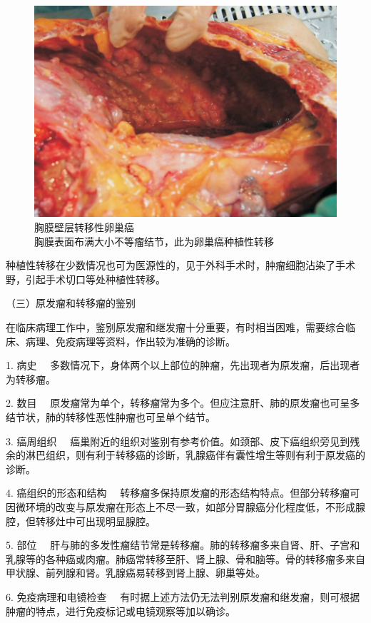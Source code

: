 \begin{figure}[!htbp]
 \centering
 \includegraphics{./images/Image00076.jpg}
 \caption{胸膜壁层转移性卵巢癌 \\ {\small 胸膜表面布满大小不等瘤结节，此为卵巢癌种植性转移}}
 \label{fig5-9}
  \end{figure}



种植性转移在少数情况也可为医源性的，见于外科手术时，肿瘤细胞沾染了手术野，引起手术切口等处种植性转移。

{（三）原发瘤和转移瘤的鉴别}

在临床病理工作中，鉴别原发瘤和继发瘤十分重要，有时相当困难，需要综合临床、病理、免疫病理等资料，作出较为准确的诊断。

{1. 病史}
　多数情况下，身体两个以上部位的肿瘤，先出现者为原发瘤，后出现者为转移瘤。

{2. 数目}
　原发瘤常为单个，转移瘤常为多个。但应注意肝、肺的原发瘤也可呈多结节状，肺的转移性恶性肿瘤也可呈单个结节。

{3. 癌周组织}
　癌巢附近的组织对鉴别有参考价值。如颈部、皮下癌组织旁见到残余的淋巴组织，则有利于转移癌的诊断，乳腺癌伴有囊性增生等则有利于原发癌的诊断。

{4. 癌组织的形态和结构}
　转移瘤多保持原发瘤的形态结构特点。但部分转移瘤可因微环境的改变与原发瘤在形态上不尽一致，如部分胃腺癌分化程度低，不形成腺腔，但转移灶中可出现明显腺腔。

{5. 部位}
　肝与肺的多发性瘤结节常是转移瘤。肺的转移瘤多来自肾、肝、子宫和乳腺等的各种癌或肉瘤。肺癌常转移至肝、肾上腺、骨和脑等。骨的转移瘤多来自甲状腺、前列腺和肾。乳腺癌易转移到肾上腺、卵巢等处。

{6. 免疫病理和电镜检查}
　有时据上述方法仍无法判别原发瘤和继发瘤，则可根据肿瘤的特点，进行免疫标记或电镜观察等加以确诊。

